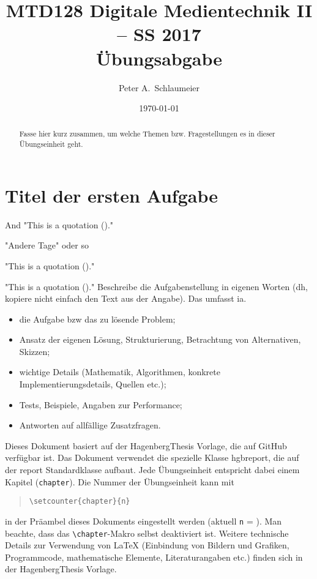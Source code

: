 \documentclass[notitlepage,german]{report}
\author{Peter A.\ Schlaumeier}
\title{MTD128 Digitale Medientechnik II -- SS 2017\\
				Übungsabgabe \arabic{chapter}}
\date{\today}
\begin{document}
\maketitle

\begin{abstract}\noindent
Fasse hier kurz zusammen, um welche Themen bzw. Fragestellungen 
es in dieser Übungseinheit geht.
\end{abstract}


\section{Titel der ersten Aufgabe}



And "{This} is a quotation (\languagename)."

"Andere Tage" oder so

\EnableQuotes
"This is a quotation (\languagename)."


"This is a quotation (\languagename)."
Beschreibe die Aufgabenstellung in eigenen Worten 
(dh, kopiere nicht einfach den Text aus der Angabe).
Das umfasst ia.
\begin{itemize}
\item
	die Aufgabe bzw das zu lösende Problem;
\item
	Ansatz der eigenen Lösung, Strukturierung, Betrachtung von Alternativen, Skizzen;
\item
	wichtige Details (Mathematik, Algorithmen, konkrete Implementierungsdetails,
	Quellen \cite{Sedgewick2011} %
	etc.);
\item
	Tests, Beispiele, Angaben zur Performance;
\item
	Antworten auf allfällige Zusatzfragen.
\end{itemize}
%
Dieses Dokument basiert auf der \textsf{HagenbergThesis} 
Vorlage, die auf GitHub%
verfügbar ist.
Das Dokument verwendet die spezielle Klasse \textsf{hgbreport}, die auf der \textsf{report}
Standardklasse aufbaut. Jede Übungseinheit entspricht dabei einem Kapitel (\texttt{chapter}).
Die Nummer der Übungseinheit kann mit
\begin{quote}
\verb!\setcounter{chapter}{n}!
\end{quote}
in der Präambel dieses Dokuments eingestellt werden (aktuell \texttt{n} = ).
Man beachte, dass das \verb!\chapter!-Makro selbst deaktiviert ist.
Weitere technische Details zur Verwendung von LaTeX (Einbindung von Bildern und Grafiken,
Programmcode, mathematische Elemente, 
Literaturangaben etc.) finden sich in der \textsf{HagenbergThesis} Vorlage.
\end{document}
